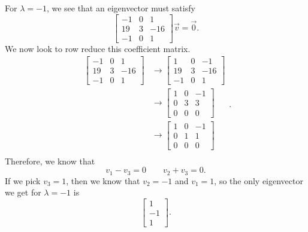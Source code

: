 \begin{exampleSol}
For $\lambda = -1$, we see that an eigenvector must satisfy
\[ \begin{bmatrix} -1 & 0 & 1 \\ 19 & 3 & -16 \\ -1 & 0 & 1 \end{bmatrix} \vec{v} = \vec{0}.\] We now look to row reduce this coefficient matrix. 
\[
\begin{split}
\begin{bmatrix} -1 & 0 & 1 \\ 19 & 3 & -16 \\ -1 & 0 & 1 \end{bmatrix} &\rightarrow \begin{bmatrix} 1 & 0 & -1 \\ 19 & 3 & -16 \\ -1 & 0 & 1 \end{bmatrix} \\
&\rightarrow \begin{bmatrix} 1 & 0 & -1 \\ 0 & 3 & 3 \\ 0 & 0 & 0 \end{bmatrix} \\
&\rightarrow \begin{bmatrix} 1 & 0 & -1 \\ 0 & 1 & 1 \\ 0 & 0 & 0 \end{bmatrix} \\
\end{split}.
\]
Therefore, we know that \[ v_1 - v_3 = 0 \qquad v_2 + v_3 = 0. \] If we pick $v_3 = 1$, then we know that $v_2 = -1$ and $v_1 = 1$, so the only eigenvector we get for $\lambda = -1$ is \[ \begin{bmatrix} 1 \\ -1 \\ 1 \end{bmatrix}. \]


\end{exampleSol}

